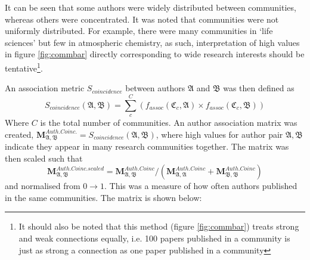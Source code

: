 It can be seen that some authors were widely distributed between communities, whereas others were concentrated.
It was noted that communities were not uniformly distributed. For example, there were many communities in `life sciences' but few in atmospheric chemistry, as such, interpretation of high values in figure \ref{fig:commbar} directly corresponding to wide research interests should be tentative\footnote{It should also be noted that this method (figure \ref{fig:commbar}) treats strong and weak connections equally, i.e. 100 papers published in a community is just as strong a connection as one paper published in a community}.

An association metric $S_{coincidence}$ between authors $\mathfrak{A}$ and $\mathfrak{B}$ was then defined as $$S_{coincidence}\left( \mathfrak{A} , \mathfrak{B} \right) = \sum_c^C \left(f_{assoc} \left( \mathfrak{C}_c , \mathfrak{A} \right)\times f_{assoc}\left( \mathfrak{C}_c , \mathfrak{B} \right) \right) $$
Where $C$ is the total number of communities. An author association matrix was created, $\mathbf{M}^{Auth. Coinc.}_{\mathfrak{A} , \mathfrak{B}} = S_{coincidence}\left( \mathfrak{A} , \mathfrak{B} \right)$, where high values for author pair $\mathfrak{A} , \mathfrak{B}$ indicate they appear in many research communities together. The matrix was then scaled such that 
$$\mathbf{M}^{Auth. Coinc.scaled}_{\mathfrak{A} , \mathfrak{B}} =  \mathbf{M}^{Auth. Coinc}_{\mathfrak{A} , \mathfrak{B}} /  \left( \mathbf{M}^{Auth. Coinc}_{\mathfrak{A} , \mathfrak{A}} + \mathbf{M}^{Auth. Coinc}_{\mathfrak{B} , \mathfrak{B}} \right) $$
and normalised from $0 \rightarrow 1$. This was a measure of how often authors published in the same communities. The matrix is shown below:
